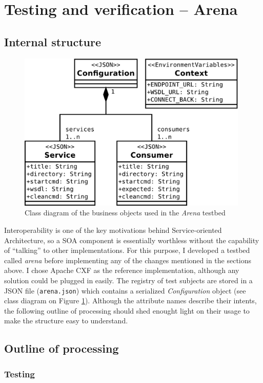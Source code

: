 \section{Testing and verification -- Arena}

\subsection{Internal structure}

\begin{figure}[htbp]
 \centering
 \includegraphics[width=11cm]{images/clsdArena.pdf}
 \caption{Class diagram of the business objects used in the \emph{Arena} testbed}
 \label{fig:clsdArena}
\end{figure}

Interoperability is one of the key motivations behind Service-oriented Architecture, so a SOA component is essentially worthless without the capability of ``talking'' to other implementations. For this purpose, I developed a testbed called \emph{arena} before implementing any of the changes mentioned in the sections above. I chose Apache CXF as the reference implementation, although any solution could be plugged in easily. The registry of test subjects are stored in a JSON file (\verb|arena.json|) which contains a serialized \emph{Configuration} object (see class diagram on Figure \ref{fig:clsdArena}). Although the attribute names describe their intents, the following outline of processing should shed enought light on their usage to make the structure easy to understand.

\subsection{Outline of processing}

\subsubsection{Testing}

